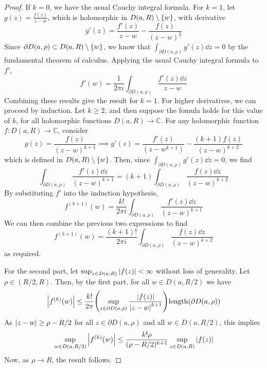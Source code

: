 \begin{proof}
	If \( k = 0 \), we have the usual Cauchy integral formula.
	For \( k = 1 \), let \( g(z) = \frac{f(z)}{z-w} \), which is holomorphic in \( D(a,R) \setminus \qty{w} \), with derivative
	\[
		g'(z) = \frac{f'(z)}{z-w} - \frac{f(z)}{(z-w)^2}
	\]
	Since \( \partial D(a,\rho) \subset D(a,R) \setminus \qty{w} \), we know that \( \int_{\partial D(a,\rho)} g'(z) \dd{z} = 0 \) by the fundamental theorem of calculus.
	Applying the usual Cauchy integral formula to \( f' \),
	\[
		f'(w) = \frac{1}{2\pi i}\int_{\partial D(a,\rho)} \frac{f'(z) \dd{z}}{z-w}
	\]
	Combining these results give the result for \( k = 1 \).
	For higher derivatives, we can proceed by induction.
	Let \( k \geq 2 \), and then suppose the fomula holds for this value of \( k \), for all holomorphic functions \( D(a,R) \to \mathbb C \).
	For any holomorphic function \( f \colon D(a,R) \to \mathbb C \), consider
	\[
		g(z) = \frac{f(z)}{(z-w)^{k+1}} \implies g'(z) = \frac{f'(z)}{(z-w^{k+1})} - \frac{(k+1)f(z)}{(z-w)^{k+2}}
	\]
	which is defined in \( D(a,R) \setminus \qty{w} \).
	Then, since \( \int_{\partial D(a,\rho)} g'(z) \dd{z} = 0 \), we find
	\[
		\int_{\partial D(a,\rho)} \frac{f'(z) \dd{z}}{(z-w)^{k+1}} = (k+1) \int_{\partial D(a,\rho)} \frac{f(z) \dd{z}}{(z-w)^{k+2}}
	\]
	By substituting \( f' \) into the induction hypothesis,
	\[
		f^{(k+1)}(w) = \frac{k!}{2\pi i} \int_{\partial D(a,\rho)} \frac{f'(z) \dd{z}}{(z-w)^{k+1}}
	\]
	We can then combine the previous two expressions to find
	\[
		f^{(k+1)}(w) = \frac{(k+1)!}{2\pi i} \int_{\partial D(a,\rho)} \frac{f(z) \dd{z}}{(z-w)^{k+2}}
	\]
	as required.

	For the second part, let \( \sup_{z \in D(a,R)} \abs{f(z)} < \infty \) without loss of generality.
	Let \( \rho \in (R/2, R) \).
	Then, by the first part, for all \( w \in D(a,R/2) \) we have
	\[
		\abs{f^{(k)}(w)} \leq \frac{k!}{2\pi} \qty(\sup_{z \in \partial D(a,\rho)} \frac{\abs{f(z)}}{\abs{z-w}^{k+1}}) \mathrm{length}(\partial D(a,\rho))
	\]
	As \( \abs{z-w} \geq \rho - R/2 \) for all \( z \in \partial D(a,\rho) \) and all \( w \in D(a,R/2) \), this implies
	\[
		\sup_{w \in D(a,R/2)} \abs{f^{(k)}(w)} \leq \frac{k!\rho}{(\rho - R/2)^{k+1}} \sup_{z \in D(a,R)} \abs{f(z)}
	\]
	Now, as \( \rho \to R \), the result follows.
\end{proof}

